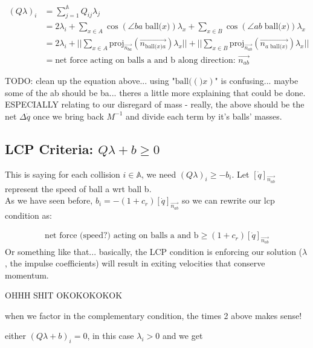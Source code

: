 \documentclass[12pt]{article}
\newcommand{\bigA}{{\mathbb{A}}}
\newcommand{\ball}[1]{\text{ball(} #1 \text{)}}
\newcommand{\proj}[2]{\text{proj}_{#1}(#2)}
\begin{document}
\begin{align*}
(Q \lambda)_i 
    &= \sum_{j = 1}^{\bigA} Q_{ij} \lambda_j\\
    &= 2\lambda_i + \sum_{x \in A}^{} \cos(\angle ba\;\ball{x})\lambda_x + \sum_{x \in B}^{} \cos(\angle ab\;\ball{x})\lambda_x\\
    &= 2\lambda_i
        + ||\sum_{x \in A}^{}\proj{\overrightarrow{n_{ba}}}{\overrightarrow{n_{\ball{x}a}}} \lambda_x||
        + ||\sum_{x \in B}^{}\proj{\overrightarrow{n_{ab}}}{\overrightarrow{n_{a\;\ball{x}}}} \lambda_x||\\
    &= \text{net force acting on balls a and b along direction: } \overrightarrow{n_{ab}}
\end{align*}


TODO: clean up the equation above... using "$\ball(x)$" is confusing... maybe some of the ab should be ba...
theres a little more explaining that could be done. ESPECIALLY relating to our disregard of mass - 
really, the above should be the net $\Delta \dot{q}$ once we bring back $M^{-1}$ and divide each
term by it's balls' masses.

\subsection*{LCP Criteria: $Q\lambda + b \geq 0$}

This is saying for each collision $i \in \bigA$, we need $(Q\lambda)_i \geq -b_i$.
Let $[\dot{q}]_{\overrightarrow{n_{ab}}}$ represent the speed of ball a wrt ball b.\\
As we have seen before, $b_i = -(1 + c_r) [\dot{q}]_{\overrightarrow{n_{ab}}}$
so we can rewrite our lcp condition as:

\begin{align*}
    \text{net force (speed?) acting on balls a and b} \geq (1 + c_r) [\dot{q}]_{\overrightarrow{n_{ab}}}
\end{align*}
\newline{}
Or something like that... basically, the LCP condition is enforcing our solution ($\lambda$,
the impulse coefficients) will result in exiting velocities that conserve momentum.




OHHH SHIT OKOKOKOKOK

when we factor in the complementary condition, the times 2 above makes sense!

either $(Q\lambda + b)_i = 0$, in this case $\lambda_i > 0$ and we get
\end{document}
